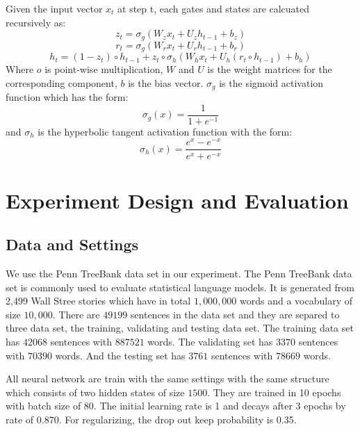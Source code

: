 \documentclass[]{article}
\begin{document}
Given the input vector $x_t$ at step t, each gates and states are calcuated recursively as:
\begin{equation}
z_t = \sigma_g(W_zx_t+U_{z}h_{t-1}+b_z)
\end{equation}	
\begin{equation}
r_t =  \sigma_g(W_rx_t+U_{r}h_{t-1}+b_r)
\end{equation}	
\begin{equation}
h_t=(1-z_t) \circ h_{t-1} + z_t \circ \sigma_h(W_hx_t+U_{h}(r_t \circ h_{t-1})+b_h)
\end{equation}
Where $o$ is point-wise multiplication, $W$ and $U$ is the weight matrices for the corresponding component, $b$ is the bias vector.
$\sigma_g$ is the sigmoid activation function which has the form:
\begin{equation}
\sigma_g(x) = \frac{1}{1+e^{-1}}
\end{equation}
and $\sigma_h$ is the hyperbolic tangent activation function with the form:
\begin{equation}
\sigma_h(x)=\frac{e^x - e^{-x}}{e^x + e^{-x}}	
\end{equation}

\section{Experiment Design and Evaluation}


\subsection{Data and Settings}
We use the Penn TreeBank data set in our experiment. 
The Penn TreeBank data set is commonly used to evaluate statistical language models.
It is generated from 2,499 Wall Stree stories which have in total $1,000,000$ words and a vocabulary of size $10,000$.
There are $49199$ sentences in the data set and they are separed to three data set, the training, validating and testing data set.
The training data set has $42068$ sentences with $887521$ words.
The validating set has $3370$ sentences with $70390$ words. 
And the testing set has $3761$ sentences with $78669$ words.


All neural network are train with the same settings with the same structure which consists of two hidden states of size $1500$.
They are trained in 10 epochs with batch size of 80. 
The initial learning rate is 1 and decays after 3 epochs by rate of 0.870.
For regularizing, the drop out keep probability is 0.35.
\end{document}
